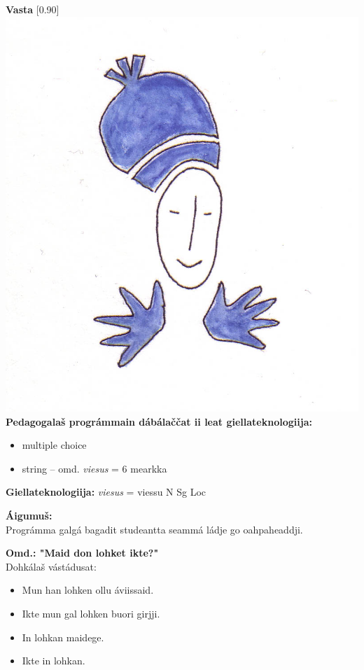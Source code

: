 \documentclass[landscape,norsk,11pt]{seminar}
\begin{document}
\begin{slide}
\newslide
\textbf{Vasta}
\scalebox{0.90}[0.90]{\includegraphics{img/vasta.png}} \\


\newslide
\textbf{Pedagogalaš prográmmain dábálaččat ii leat giellateknologiija:} 
\begin{itemize}
\item multiple choice 
\item string -- omd. \textit{viesus} = 6 mearkka 
\end{itemize}

\textbf{Giellateknologiija:} \textit{viesus} = viessu N Sg Loc 


\newslide
\textbf{Áigumuš:}\\
Prográmma galgá bagadit studeantta seammá ládje go oahpaheaddji.

\newslide
\textbf{Omd.: "Maid don lohket ikte?"} \\
Dohkálaš vástádusat:
\begin{itemize}
\item Mun han lohken ollu \'aviissaid. 
\item Ikte mun gal lohken buori girjji. 
\item In lohkan maidege. 
\item Ikte in lohkan.
\end{itemize}


\end{slide}
\end{document}
